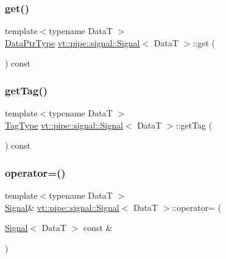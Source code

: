 \subsubsection{\texorpdfstring{get()}{get()}}
{\footnotesize\ttfamily template$<$typename DataT $>$ \\
\hyperlink{structvt_1_1pipe_1_1signal_1_1_signal_a9c8166338314e5d595575c21eaa42859}{Data\+Ptr\+Type} \hyperlink{structvt_1_1pipe_1_1signal_1_1_signal}{vt\+::pipe\+::signal\+::\+Signal}$<$ DataT $>$\+::get (\begin{DoxyParamCaption}{ }\end{DoxyParamCaption}) const\hspace{0.3cm}{\ttfamily [inline]}}

\mbox{\label{structvt_1_1pipe_1_1signal_1_1_signal_a0d55d4712aadfc8cc848e8bd45814351}} 
\subsubsection{\texorpdfstring{get\+Tag()}{getTag()}}
{\footnotesize\ttfamily template$<$typename DataT $>$ \\
\hyperlink{namespacevt_a84ab281dae04a52a4b243d6bf62d0e52}{Tag\+Type} \hyperlink{structvt_1_1pipe_1_1signal_1_1_signal}{vt\+::pipe\+::signal\+::\+Signal}$<$ DataT $>$\+::get\+Tag (\begin{DoxyParamCaption}{ }\end{DoxyParamCaption}) const\hspace{0.3cm}{\ttfamily [inline]}}

\mbox{\label{structvt_1_1pipe_1_1signal_1_1_signal_a31c544fb4732587116decd8adddc6fa3}} 
\subsubsection{\texorpdfstring{operator=()}{operator=()}}
{\footnotesize\ttfamily template$<$typename DataT $>$ \\
\hyperlink{structvt_1_1pipe_1_1signal_1_1_signal}{Signal}\& \hyperlink{structvt_1_1pipe_1_1signal_1_1_signal}{vt\+::pipe\+::signal\+::\+Signal}$<$ DataT $>$\+::operator= (\begin{DoxyParamCaption}\item[{\hyperlink{structvt_1_1pipe_1_1signal_1_1_signal}{Signal}$<$ DataT $>$ const \&}]{ }\end{DoxyParamCaption})\hspace{0.3cm}{\ttfamily [default]}}

